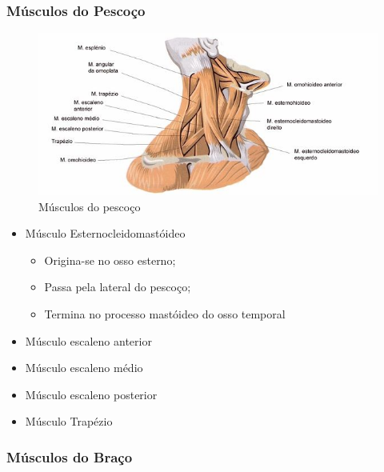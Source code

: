 \documentclass[
]{book}
\providecommand{\tightlist}{%
  \setlength{\itemsep}{0pt}\setlength{\parskip}{0pt}}
\begin{document}
\hypertarget{muxfasculos-do-pescouxe7o}{%
\subsubsection{Músculos do Pescoço}\label{muxfasculos-do-pescouxe7o}}

\begin{figure}

{\centering \includegraphics[width=0.9\linewidth]{figuras/Aula5-5-musculos-do-pescoco} 

}

\caption{Músculos do pescoço}\label{fig:unnamed-chunk-9}
\end{figure}

\begin{itemize}
\tightlist
\item
  Músculo Esternocleidomastóideo

  \begin{itemize}
  \tightlist
  \item
    Origina-se no osso esterno;
  \item
    Passa pela lateral do pescoço;
  \item
    Termina no processo mastóideo do osso temporal
  \end{itemize}
\item
  Músculo escaleno anterior
\item
  Músculo escaleno médio
\item
  Músculo escaleno posterior
\item
  Músculo Trapézio
\end{itemize}

\hypertarget{muxfasculos-do-brauxe7o}{%
\subsubsection{Músculos do Braço}\label{muxfasculos-do-brauxe7o}}
\end{document}

